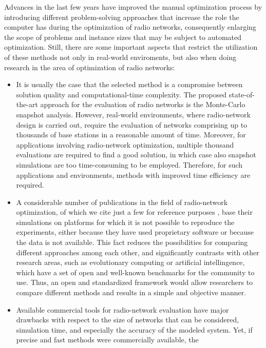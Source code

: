 Advances in the last few years have improved the manual optimization
process by introducing different problem-solving approaches that increase
the role the computer has during the optimization of radio networks,
consequently enlarging the scope of problems and instance sizes that
may be subject to automated optimization. Still, there are some important
aspects that restrict the utilization of these methods not only in
real-world enviroments, but also when doing research in the area of
optimization of radio networks:
\begin{itemize}
\item It is usually the case that the selected method is a compromise between
solution quality and computational-time complexity. The proposed state-of-the-art
approach for the evaluation of radio networks is the Monte-Carlo snapshot
analysis. However, real-world environments, where radio-network design
is carried out, require the evaluation of networks comprising up to
thousands of base stations in a reasonable amount of time. Moreover,
for applications involving radio-network optimization, multiple thousand
evaluations are required to find a good solution, in which case also
snapshot simulations are too time-consuming to be employed. Therefore,
for such applications and environments, methods with improved time
efficiency are required.
\item A considerable number of publications in the field of radio-network
optimization, of which we cite just a few for reference purposes \cite{amaldi2007radio_planning,siomina2007minimum_pilot_power,chen2008automated,chen2009fast,gordejuela2009two,siomina2008enhancing},
base their simulations on platforms for which it is not possible to
reproduce the experiments, either because they have used proprietary
software or because the data is not available. This fact reduces the
possibilities for comparing different approaches among each other,
and significantly contrasts with other research areas, such as evolutionary
computing or artificial intellingence, which have a set of open and
well-known benchmarks for the community to use. Thus, an open and
standardized framework would allow researchers to compare different
methods and results in a simple and objective manner.
\item Available commercial tools for radio-network evaluation have major
drawbacks with respect to the size of networks that can be considered,
simulation time, and especially the accuracy of the modeled system.
Yet, if precise and fast methods were commercially available, the

\end{itemize}
